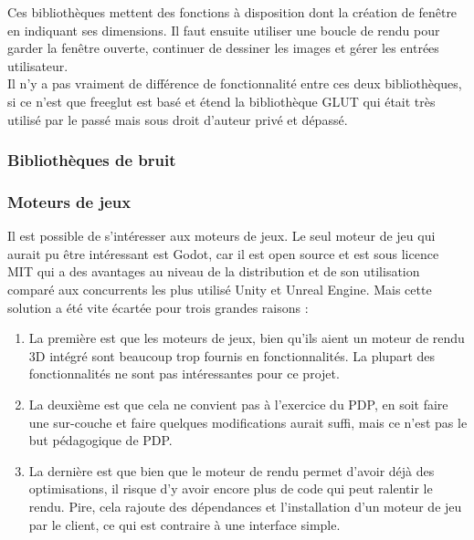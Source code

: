 \documentclass[a4paper]{article}
\begin{document}
    Ces bibliothèques mettent des fonctions à disposition dont la création de fenêtre en indiquant ses dimensions. Il faut ensuite utiliser une boucle de rendu pour garder la fenêtre ouverte, continuer de dessiner les images et gérer les entrées utilisateur.\\
    
    Il n'y a pas vraiment de différence de fonctionnalité entre ces deux bibliothèques, si ce n'est que freeglut est basé et étend la bibliothèque GLUT qui était très utilisé par le passé mais sous droit d'auteur privé et dépassé.
 
 \subsubsection{Bibliothèques de bruit}
 
 
 \subsubsection{Moteurs de jeux}

    Il est possible de s'intéresser aux moteurs de jeux. Le seul moteur de jeu qui aurait pu être intéressant est Godot, car il est open source et est sous licence MIT qui a des avantages au niveau de la distribution et de son utilisation comparé aux concurrents les plus utilisé Unity et Unreal Engine. Mais cette solution a été vite écartée pour trois grandes raisons : 
    \begin{enumerate}
        \item  La première est que les moteurs de jeux, bien qu'ils aient un moteur de rendu 3D intégré sont beaucoup trop fournis en fonctionnalités. La plupart des fonctionnalités ne sont pas intéressantes pour ce projet. 
        
        \item La deuxième est que cela ne convient pas à l'exercice du PDP, en soit faire une sur-couche et faire quelques modifications aurait suffi, mais ce n'est pas le but pédagogique de PDP.
        
        \item  La dernière est que bien que le moteur de rendu permet d'avoir déjà des optimisations, il risque d'y avoir encore plus de code qui peut ralentir le rendu. Pire, cela rajoute des dépendances et l'installation d'un moteur de jeu par le client, ce qui est contraire à une interface simple.
    \end{enumerate}
\end{document}
